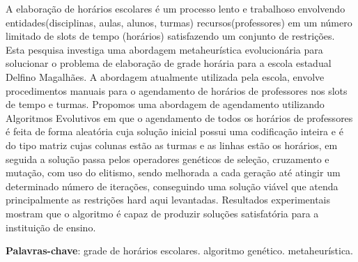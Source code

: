 \documentclass[
	12pt,				%
	openright,			%
	oneside,			%
	a4paper,			%
	english,			%
	french,				%
	spanish,			%
	brazil				%
	]{unimontes-ppgmsc-abntex2}
\begin{document}

\frenchspacing 


\imprimircapa

\imprimirfolhaderosto*



\setlength{\absparsep}{18pt} %
\begin{resumo}
A elaboração de horários escolares é um processo lento e trabalhoso envolvendo entidades(disciplinas, aulas, alunos, turmas) recursos(professores) em um número limitado de slots de tempo (horários) satisfazendo um conjunto de restrições. Esta pesquisa investiga uma abordagem metaheurística evolucionária para solucionar o problema de elaboração de grade horária para a escola estadual Delfino Magalhães. A abordagem atualmente utilizada pela escola, envolve procedimentos manuais para o agendamento de horários de professores nos slots de tempo e turmas. Propomos uma abordagem de agendamento utilizando Algoritmos Evolutivos em que o agendamento de todos os horários de professores é feita de forma aleatória cuja solução inicial possui uma codificação inteira e é do tipo matriz cujas colunas estão as turmas e as linhas estão os horários, em seguida a solução passa pelos operadores genéticos de seleção, cruzamento e mutação, com uso do elitismo, sendo melhorada a cada geração até atingir um determinado número de iterações, conseguindo uma solução viável que atenda principalmente as restrições hard aqui levantadas. Resultados experimentais mostram que o algoritmo é capaz de produzir soluções satisfatória para a instituição de ensino.

 \textbf{Palavras-chave}: grade de horários escolares. algoritmo genético. metaheurística.
\end{resumo}


\listoffigures*
\cleardoublepage

\listoftables*
\cleardoublepage
\end{document}
